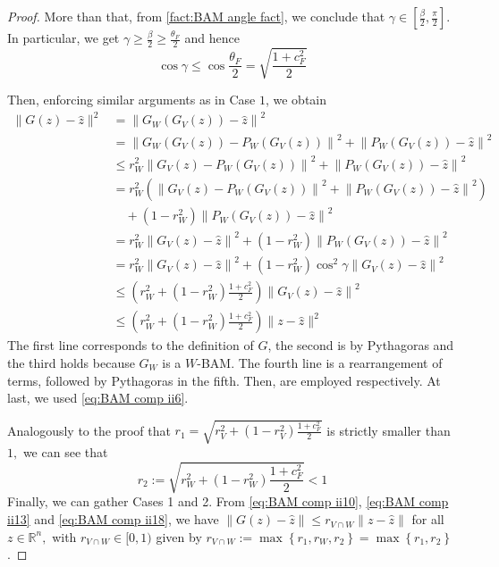 \documentclass[smallextended,numbook,nospthms]{svjour3}
\theoremstyle{plain}
\theoremstyle{definition}
\def\RR{\mathds R}
\begin{document}
\begin{proof}
	More than that, from \cref{fact:BAM angle fact}, we conclude that $\gamma \in\left[\frac{\beta}{2}, \frac{\pi}{2}\right]$. In particular, we get $\gamma \geq \frac{\beta}{2} \geq \frac{\theta_{F}}{2}$ and hence
	\begin{equation}\label{eq:BAM comp ii17}
		\cos \gamma \leq \cos \frac{\theta_{F}}{2}=\sqrt{\frac{1+c_{F}^{2}}{2}}
	\end{equation}
	
	Then, enforcing similar arguments as in Case $1$, we obtain
	\begin{align}
		\|G(z)-\hat{z}\|^{2} &=\left\|G_{W}\left(G_{V}(z)\right)-\hat{z}\right\|^{2} \\
		&=\left\|G_{W}\left(G_{V}(z)\right)-P_{W}\left(G_{V}(z)\right)\right\|^{2}+\left\|P_{W}\left(G_{V}(z)\right)-\hat{z}\right\|^{2} \\
		& \leq r_{W}^{2}\left\|G_{V}(z)-P_{W}\left(G_{V}(z)\right)\right\|^{2}+\left\|P_{W}\left(G_{V}(z)\right)-\hat{z}\right\|^{2} \\
		&=r_{W}^{2}\left(\left\|G_{V}(z)-P_{W}\left(G_{V}(z)\right)\right\|^{2}+\left\|P_{W}\left(G_{V}(z)\right)-\hat{z}\right\|^{2}\right) \\
		& \quad +\left(1-r_{W}^{2}\right)\left\|P_{W}\left(G_{V}(z)\right)-\hat{z}\right\|^{2} \\
		&=r_{W}^{2}\left\|G_{V}(z)-\hat{z}\right\|^{2}+\left(1-r_{W}^{2}\right)\left\|P_{W}\left(G_{V}(z)\right)-\hat{z}\right\|^{2} \\
		&=r_{W}^{2}\left\|G_{V}(z)-\hat{z}\right\|^{2}+\left(1-r_{W}^{2}\right) \cos ^{2} \gamma\left\|G_{V}(z)-\hat{z}\right\|^{2} \\
		& \leq\left(r_{W}^{2}+\left(1-r_{W}^{2}\right) \frac{1+c_{F}^{2}}{2}\right)\left\|G_{V}(z)-\hat{z}\right\|^{2} \\
		& \leq\left(r_{W}^{2}+\left(1-r_{W}^{2}\right) \frac{1+c_{F}^{2}}{2}\right)\|z-\hat{z}\|^{2} \label{eq:BAM comp ii18}
	\end{align}
	The first line corresponds to the definition of $G$, the second is by Pythagoras and the third holds because $G_{W}$ is a $W$-BAM. The fourth line is a rearrangement of terms, followed by Pythagoras in the fifth. Then, \label{eq:BAM comp ii16,eq:BAM comp ii17} are employed respectively. At last, we used \cref{eq:BAM comp ii6}.
	
	Analogously to the proof that $r_{1}=\sqrt{r_{V}^{2}+\left(1-r_{V}^{2}\right) \frac{1+c_{F}^{2}}{2}}$ is strictly smaller than $1,$ we can see that
	\begin{equation}
		r_{2}:=\sqrt{r_{W}^{2}+\left(1-r_{W}^{2}\right) \frac{1+c_{F}^{2}}{2}}<1
	\end{equation}
	Finally, we can gather Cases 1 and 2. From \cref{eq:BAM comp ii10}, \cref{eq:BAM comp ii13} and \cref{eq:BAM comp ii18}, we have $\|G(z)-\hat{z}\| \leq r_{V \cap W}\|z-\hat{z}\|$ for all $z \in \RR^{n},$ with $r_{V \cap W} \in[0,1)$ given by $r_{V \cap W}:=\max \left\{r_{1}, r_{W}, r_{2}\right\}=\max \left\{r_{1}, r_{2}\right\}$.
\end{proof}
\end{document}
